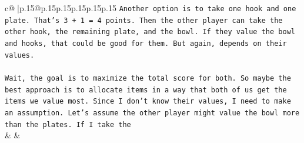 \documentclass{article}
\begin{document}
{\begin{supertabular}{c@{$\;$}|p{.15\linewidth}@{}p{.15\linewidth}p{.15\linewidth}p{.15\linewidth}p{.15\linewidth}p{.15\linewidth}}
{{{\texttt{Another option is to take one hook and one plate. That's 3 + 1 = 4 points. Then the other player can take the other hook, the remaining plate, and the bowl. If they value the bowl and hooks, that could be good for them. But again, depends on their values.} \\
\\ 
\texttt{Wait, the goal is to maximize the total score for both. So maybe the best approach is to allocate items in a way that both of us get the items we value most. Since I don't know their values, I need to make an assumption. Let's assume the other player might value the bowl more than the plates. If I take the} \\
            }
        }
    }
    & & \\ \\


\end{supertabular}}
\end{document}
